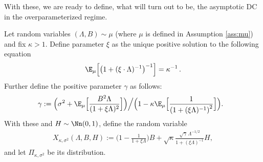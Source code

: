 With these, we are ready to define, what will turn out to be, the asymptotic DC in the overparameterized regime.
\begin{definition}\label{def:Xi}
Let random variables $(\Lambda,B)\sim \mu$ (where $\mu$ is defined in Assumption \ref{ass:mu}) and fix $\kappa>1$. Define parameter $\xi$ as the unique positive solution to the following equation
\begin{align}\label{eq:ksi}
\E_{\mu}\Big[ \big({1+(\xi\cdot\Lambda)^{-1}}\big)^{-1} \Big] = {\kappa^{-1}}\,.
\end{align}
Further define the positive parameter $\gamma$ as follows:
\begin{align}
\label{eq:gamma}
\hspace{-0.1in}\gamma := 
\Big({\sigma^2 + \E_{\mu}\Big[\frac{B^2\Lambda}{(1+\xi\Lambda)^2}\Big]}\Big)\Big/\Big({1-\kappa\E_{\mu}\Big[\frac{1}{\left(1+(\xi\Lambda)^{-1}\right)^2}\Big]}\Big).
\end{align}
With these and $H\sim\Nn(0,1)$, define the random variable
\begin{align}
X_{\kappa,\sigma^2}(\Lambda,B,H) := \Big(1-\frac{1}{1+ \xi\Lambda}\Big) B + \sqrt{\kappa}\frac{\sqrt{\gamma}\,\Lambda^{-1/2}}{1+(\xi\Lambda)^{-1}} H, \label{eq:X}
\end{align}
and let $\Pi_{\kappa,\sigma^2}$ be its distribution.
\end{definition}

%



